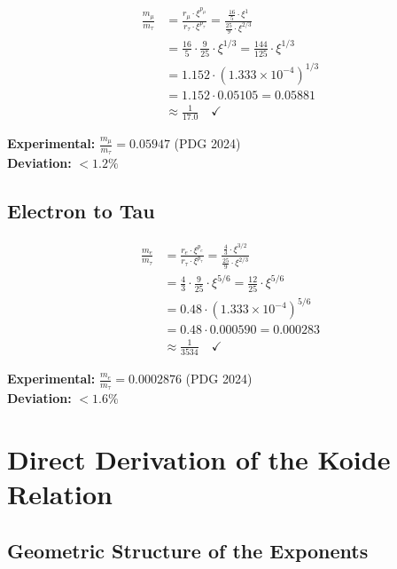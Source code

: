 	\begin{beweis}
		\begin{align}
			\frac{m_\mu}{m_\tau} &= \frac{r_\mu \cdot \xi^{p_\mu}}{r_\tau \cdot \xi^{p_\tau}} = \frac{\frac{16}{5} \cdot \xi^1}{\frac{25}{9} \cdot \xi^{2/3}} \\
			&= \frac{16}{5} \cdot \frac{9}{25} \cdot \xi^{1/3} = \frac{144}{125} \cdot \xi^{1/3} \\
			&= 1.152 \cdot (1.333 \times 10^{-4})^{1/3} \\
			&= 1.152 \cdot 0.05105 = 0.05881 \\
			&\approx \frac{1}{17.0} \quad \checkmark
		\end{align}
		
		\textbf{Experimental:} $\frac{m_\mu}{m_\tau} = 0.05947$ (PDG 2024)\\
		\textbf{Deviation:} $< 1.2\%$
	\end{beweis}
	
	\subsection{Electron to Tau}
	
	\begin{beweis}
		\begin{align}
			\frac{m_e}{m_\tau} &= \frac{r_e \cdot \xi^{p_e}}{r_\tau \cdot \xi^{p_\tau}} = \frac{\frac{4}{3} \cdot \xi^{3/2}}{\frac{25}{9} \cdot \xi^{2/3}} \\
			&= \frac{4}{3} \cdot \frac{9}{25} \cdot \xi^{5/6} = \frac{12}{25} \cdot \xi^{5/6} \\
			&= 0.48 \cdot (1.333 \times 10^{-4})^{5/6} \\
			&= 0.48 \cdot 0.000590 = 0.000283 \\
			&\approx \frac{1}{3534} \quad \checkmark
		\end{align}
		
		\textbf{Experimental:} $\frac{m_e}{m_\tau} = 0.0002876$ (PDG 2024)\\
		\textbf{Deviation:} $< 1.6\%$
	\end{beweis}
	
	\section{Direct Derivation of the Koide Relation}
	
	\subsection{Geometric Structure of the Exponents}
	
